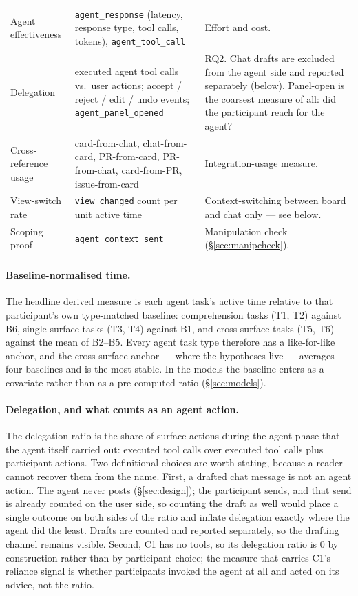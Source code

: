 \documentclass[acmsmall,review,screen]{acmart}
\newcommand{\code}[1]{\texttt{#1}}
\begin{document}
\begin{table}[t]
\begin{tabularx}{\linewidth}{@{}lLL@{}}
Agent effectiveness & \code{agent\_response} (latency, response type, tool
  calls, tokens), \code{agent\_tool\_call} & Effort and cost. \\
Delegation & executed agent tool calls vs.\ user actions; accept / reject /
  edit / undo events; \code{agent\_panel\_opened} & RQ2. Chat drafts are
  excluded from the agent side and reported separately (below). Panel-open is
  the coarsest measure of all: did the participant reach for the agent? \\
Cross-reference usage & card-from-chat, chat-from-card, PR-from-card,
  PR-from-chat, card-from-PR, issue-from-card & Integration-usage measure. \\
View-switch rate & \code{view\_changed} count per unit active time &
  Context-switching between board and chat only --- see below. \\
Scoping proof & \code{agent\_context\_sent} & Manipulation check
  (\S\ref{sec:manipcheck}). \\
\bottomrule
\end{tabularx}
\end{table}

\paragraph{Baseline-normalised time.} The headline derived measure is each agent
task's active time relative to that participant's own type-matched baseline:
comprehension tasks (T1, T2) against B6, single-surface tasks (T3, T4) against
B1, and cross-surface tasks (T5, T6) against the mean of B2--B5. Every agent
task type therefore has a like-for-like anchor, and the cross-surface anchor ---
where the hypotheses live --- averages four baselines and is the most stable. In
the models the baseline enters as a covariate rather than as a pre-computed
ratio (\S\ref{sec:models}).

\paragraph{Delegation, and what counts as an agent action.} The delegation ratio
is the share of surface actions during the agent phase that the agent itself
carried out: executed tool calls over executed tool calls plus participant
actions. Two definitional choices are worth stating, because a reader cannot
recover them from the name. First, a drafted chat message is not an agent action.
The agent never posts (\S\ref{sec:design}); the participant sends, and that send
is already counted on the user side, so counting the draft as well would place a
single outcome on both sides of the ratio and inflate delegation exactly where
the agent did the least. Drafts are counted and reported separately, so the
drafting channel remains visible. Second, C1 has no tools, so its delegation
ratio is $0$ by construction rather than by participant choice; the measure that
carries C1's reliance signal is whether participants invoked the agent at all and
acted on its advice, not the ratio.
\end{document}
